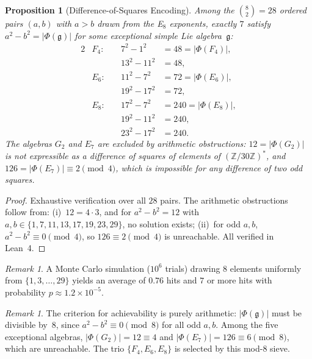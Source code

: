\documentclass[11pt]{amsart}
\theoremstyle{plain}
\newtheorem{proposition}[theorem]{Proposition}
\theoremstyle{definition}
\theoremstyle{remark}
\newtheorem{remark}[theorem]{Remark}
\newcommand{\fg}{\mathfrak{g}}
\renewcommand{\Phi}{\varPhi}
\begin{document}
\begin{proposition}[Difference-of-Squares Encoding]\label{prop:diff-squares}
Among the $\binom{8}{2} = 28$ ordered pairs $(a,b)$ with $a > b$ drawn
from the E$_8$ exponents, exactly $7$ satisfy $a^2 - b^2 = |\Phi(\fg)|$
for some exceptional simple Lie algebra~$\fg$:
\begin{alignat*}{2}
  &F_4:&\quad 7^2 - 1^2 &= 48 = |\Phi(F_4)|, \\
  &    &\quad 13^2 - 11^2 &= 48, \\
  &E_6:&\quad 11^2 - 7^2 &= 72 = |\Phi(E_6)|, \\
  &    &\quad 19^2 - 17^2 &= 72, \\
  &E_8:&\quad 17^2 - 7^2 &= 240 = |\Phi(E_8)|, \\
  &    &\quad 19^2 - 11^2 &= 240, \\
  &    &\quad 23^2 - 17^2 &= 240.
\end{alignat*}
The algebras $G_2$ and $E_7$ are excluded by arithmetic obstructions:
$12 = |\Phi(G_2)|$ is not expressible as a difference of squares of
elements of $(\mathbb{Z}/30\mathbb{Z})^*$, and $126 = |\Phi(E_7)|
\equiv 2 \pmod{4}$, which is impossible for any difference of two
odd squares.
\end{proposition}

\begin{proof}
Exhaustive verification over all $28$ pairs.  The arithmetic obstructions
follow from: (i)~$12 = 4 \cdot 3$, and for $a^2 - b^2 = 12$ with
$a,b \in \{1,7,11,13,17,19,23,29\}$, no solution exists; (ii)~for
odd $a,b$, $a^2 - b^2 \equiv 0 \pmod{4}$, so $126 \equiv 2 \pmod{4}$
is unreachable.  All verified in Lean~4.
\end{proof}

\begin{remark}\label{rem:diff-sq-significance}
A Monte Carlo simulation ($10^6$ trials) drawing $8$ elements uniformly
from $\{1,3,\ldots,29\}$ yields an average of $0.76$ hits and $7$ or
more hits with probability $p \approx 1.2 \times 10^{-5}$.
\end{remark}

\begin{remark}\label{rem:diff-sq-mod8}
The criterion for achievability is purely arithmetic: $|\Phi(\fg)|$ must
be divisible by~$8$, since $a^2 - b^2 \equiv 0 \pmod{8}$ for all odd
$a,b$.  Among the five exceptional algebras, $|\Phi(G_2)| = 12 \equiv 4$
and $|\Phi(E_7)| = 126 \equiv 6 \pmod{8}$, which are unreachable.
The trio $\{F_4, E_6, E_8\}$ is selected by this mod-$8$ sieve.
\end{remark}
\end{document}

